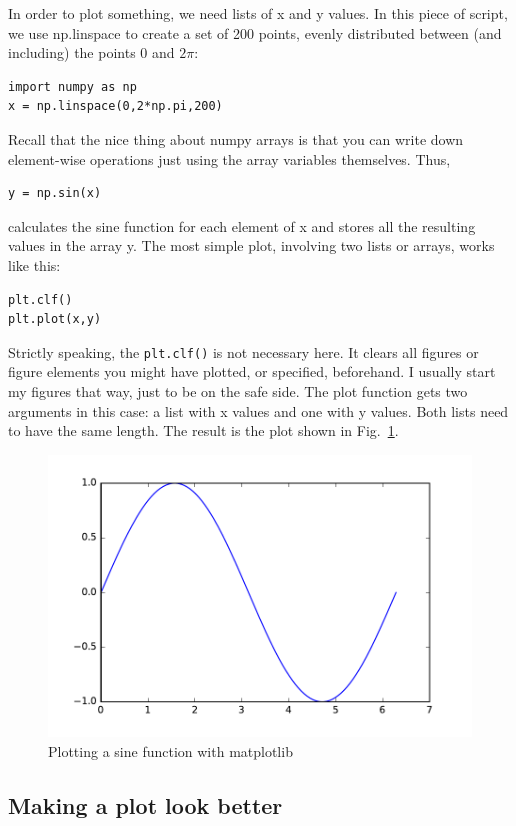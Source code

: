 \documentclass[twocolumn,apj]{openjournal}
\begin{document}
In order to plot something, we need lists of x and y values. In this piece of script, we use np.linspace to create a set of 200 points, evenly distributed between (and including) the points $0$ and $2\pi$:
\begin{lstlisting}
import numpy as np
x = np.linspace(0,2*np.pi,200)
\end{lstlisting}
Recall that the nice thing about numpy arrays is that you can write down element-wise operations just using the array variables themselves. Thus,
\begin{lstlisting}
y = np.sin(x)
\end{lstlisting}
calculates the sine function for each element of x and stores all the resulting values in the array y. The most simple plot, involving two lists or arrays, works like this:
\begin{lstlisting}
plt.clf()
plt.plot(x,y)
\end{lstlisting}
Strictly speaking, the \verb|plt.clf()| is not necessary here. It clears all figures or figure elements you might have plotted, or specified, beforehand. I usually start my figures that way, just to be on the safe side. The plot function gets two arguments in this case: a list with x values and one with y values. Both lists need to have the same length. The result is the plot shown in Fig.~\ref{SinPlot}.
\begin{figure}[htbp]
\begin{center}
\includegraphics[width=\linewidth]{sinplot.pdf}
\caption{Plotting a sine function with matplotlib}
\label{SinPlot}
\end{center}
\end{figure}

\subsection{Making a plot look better}
\end{document}
